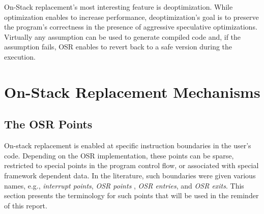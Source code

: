 On-Stack replacement's most interesting feature is deoptimization. 
While optimization enables to increase performance, deoptimization's goal is to preserve the program's correctness in the presence of aggressive speculative optimizations. 
Virtually any assumption can be used to generate compiled code and, if the assumption fails, 
OSR enables to revert back to a safe version during the execution.\\

\section{On-Stack Replacement Mechanisms}

\subsection{The OSR Points}\label{section:osrpoints}
On-stack replacement is enabled at specific instruction boundaries in the user's code.
Depending on the OSR implementation, these points can be sparse, restricted to special points in the program control flow, or associated with special framework dependent data.
In the literature, such boundaries were given various names, e.g., \textit{interrupt points}\cite{holzle1992debugging}, \textit{OSR points} \cite{fink2003design, holzle1992debugging, WebKitURL, lameed2013modular}, \textit{OSR entries}, and \textit{OSR exits}\cite{WebKitURL, lameed2013modular}.
This section presents the terminology for such points that will be used in the reminder of this report.

